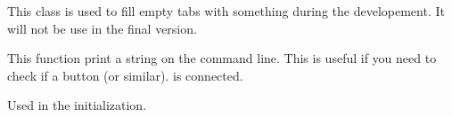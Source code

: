 \documentclass[letterpaper,10pt,english]{sphinxmanual}
\begin{document}

\begin{fulllineitems}
\label{\detokenize{index:src_GUI.Main_windows_1.EmptyTab}}
This class is  used to fill empty tabs with something during the developement.
It will not be use in the final version.

\begin{fulllineitems}
\label{\detokenize{index:src_GUI.Main_windows_1.EmptyTab.addtext}}
This function print a string on the command line. This is useful if you need to check if a button (or similar).
is connected.

\end{fulllineitems}


\begin{fulllineitems}
\label{\detokenize{index:src_GUI.Main_windows_1.EmptyTab.init_iu}}
Used in the initialization.

\end{fulllineitems}


\end{fulllineitems}

\end{document}
